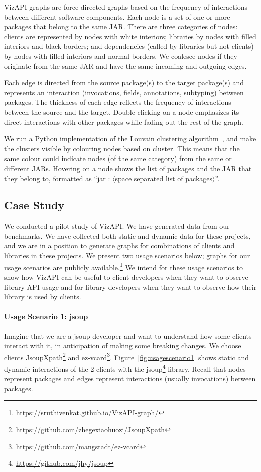 VizAPI graphs are force-directed graphs based on the frequency of
interactions between different software components.  Each node is a
set of one or more packages that belong to the same JAR.  There are
three categories of nodes: clients are represented by nodes with white
interiors; libraries by nodes with filled interiors and black borders;
and dependencies (called by libraries but not clients) by nodes with
filled interiors and normal borders.  We coalesce nodes if they
originate from the same JAR and have the same incoming and
outgoing edges.

Each edge is directed
from the source package(s) to the target package(s) and represents an interaction 
(invocations, fields, annotations, subtyping) between packages. 
The thickness of each edge reflects the frequency of interactions between the source and the target.
Double-clicking on a node emphasizes its direct interactions with other packages while fading out the rest of the graph.

We run a Python implementation of the Louvain clustering algorithm~\cite{blondel2008fast}, and make the clusters 
visible by colouring nodes based on cluster.
This means that the same colour could indicate nodes (of the same category) from the same or different JARs.
Hovering on a node shows the list of packages and 
the JAR that they belong to, 
formatted as “jar : $\langle$space separated list of packages$\rangle$”. 

\subsection{Case Study}
\label{subsec:evaluation}

We conducted a pilot study of VizAPI.
We have generated data from our benchmarks.
We have collected both static and dynamic data for these projects, 
and we are in a position
to generate graphs for combinations of clients and libraries
in these projects. 
We present two usage scenarios below; graphs for 
our usage scenarios are publicly available.\footnote{\url{https://sruthivenkat.github.io/VizAPI-graph/}}
We intend for these usage scenarios to show how VizAPI can be useful to client developers when they want to observe library API usage and for library developers when they want to observe how their library is used by clients.

\paragraph{Usage Scenario 1: jsoup}
Imagine that we are a jsoup developer and want to understand
how some clients interact with it, in anticipation of making some breaking changes. We choose clients JsoupXpath\footnote{\url{https://github.com/zhegexiaohuozi/JsoupXpath}\label{jsoupxpath}} and ez-vcard\footnote{\url{https://github.com/mangstadt/ez-vcard}\label{ez-vcard}}.
Figure~\ref{fig:usagescenario1} shows static and dynamic interactions of the 2 clients with the jsoup\footnote{\url{https://github.com/jhy/jsoup}\label{jsoup}} library. Recall that nodes represent packages and edges represent interactions (usually invocations) between packages. 

